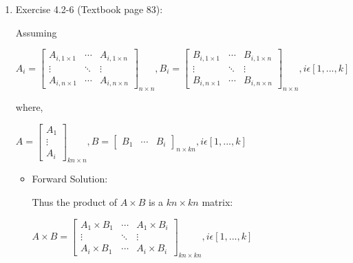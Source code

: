 \documentclass[11pt]{article}
\begin{document}
\begin{enumerate}

\itemsep 0.35in

\item Exercise 4.2-6 (Textbook page 83): 
	
	Assuming 
	
	
	\hspace{10mm} \begin{math}
		A_{i}=
		\begin{bmatrix}
		  A_{i, 1\times 1}	&\cdots &A_{i, 1\times n}\\
		  \vdots			&\ddots &\vdots\\
		  A_{i, n\times 1}	&\cdots	&A_{i, n\times n}
		\end{bmatrix}_{n \times n}
		,
		B_{i}=
		\begin{bmatrix}
		  B_{i, 1\times 1}	&\cdots &B_{i, 1\times n}\\
		  \vdots			&\ddots &\vdots\\
		  B_{i, n\times 1}	&\cdots	&B_{i, n\times n}
		\end{bmatrix}_{n \times n}
		, 
		i \epsilon [1,...,k]
	\end{math}
	
	where, 
	
	\hspace{10mm} \begin{math}
		A=
		\begin{bmatrix}
		  A_{1}	\\
		  \vdots\\
		  A_{i}	
		\end{bmatrix}_{kn \times n}
		, 
		B=
		\begin{bmatrix}
		  B_{1}	&\cdots &B_{i}
		\end{bmatrix}_{n \times kn}
		, 
		i \epsilon [1,...,k]
	\end{math}
	
	
	\begin{itemize}
    	\item Forward Solution:

		Thus the product of $A \times B$ is a $kn \times kn$ matrix:
	
		\hspace{10mm} \begin{math}
			A \times B=
			\begin{bmatrix}
			  A_{1} \times B_{1} &\cdots & A_{1} \times B_{i}\\
			  \vdots			 &\ddots & \vdots\\
			  A_{i} \times B_{1} &\cdots & A_{i} \times B_{i}
			\end{bmatrix}_{kn \times kn}
		, 
			i \epsilon [1,...,k]
		\end{math}
	

\end{itemize}
\end{enumerate}
\end{document}
